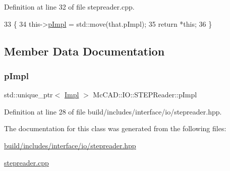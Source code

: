 Definition at line 32 of file stepreader.\+cpp.


\begin{DoxyCode}
33                           \{
34   this->\hyperlink{classMcCAD_1_1IO_1_1STEPReader_a3bbb72987d6bad33c403c85401c62160}{pImpl} = std::move(that.pImpl);
35   \textcolor{keywordflow}{return} *\textcolor{keyword}{this};
36 \}
\end{DoxyCode}


\subsection{Member Data Documentation}
\mbox{\label{classMcCAD_1_1IO_1_1STEPReader_a3bbb72987d6bad33c403c85401c62160}} 
\subsubsection{\texorpdfstring{p\+Impl}{pImpl}}
{\footnotesize\ttfamily std\+::unique\+\_\+ptr$<$ \hyperlink{classMcCAD_1_1IO_1_1STEPReader_1_1Impl}{Impl} $>$ Mc\+C\+A\+D\+::\+I\+O\+::\+S\+T\+E\+P\+Reader\+::p\+Impl\hspace{0.3cm}{\ttfamily [private]}}



Definition at line 28 of file build/includes/interface/io/stepreader.\+hpp.



The documentation for this class was generated from the following files\+:\begin{DoxyCompactItemize}
\item 
\hyperlink{build_2includes_2interface_2io_2stepreader_8hpp}{build/includes/interface/io/stepreader.\+hpp}\item 
\hyperlink{stepreader_8cpp}{stepreader.\+cpp}\end{DoxyCompactItemize}
